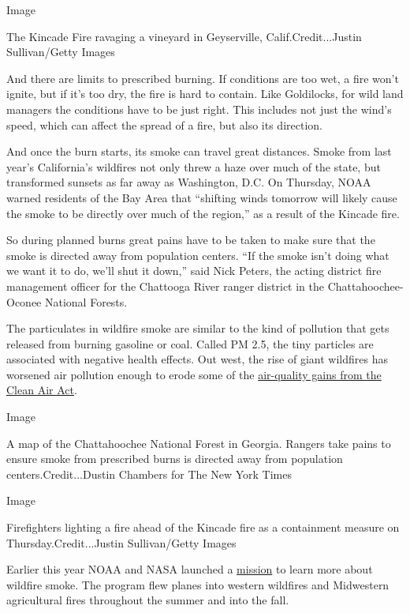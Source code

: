 Image

The Kincade Fire ravaging a vineyard in Geyserville,
Calif.Credit...Justin Sullivan/Getty Images

And there are limits to prescribed burning. If conditions are too wet, a
fire won't ignite, but if it's too dry, the fire is hard to contain.
Like Goldilocks, for wild land managers the conditions have to be just
right. This includes not just the wind's speed, which can affect the
spread of a fire, but also its direction.

And once the burn starts, its smoke can travel great distances. Smoke
from last year's California's wildfires not only threw a haze over much
of the state, but transformed sunsets as far away as Washington, D.C. On
Thursday, NOAA warned residents of the Bay Area that ``shifting winds
tomorrow will likely cause the smoke to be directly over much of the
region,'' as a result of the Kincade fire.

So during planned burns great pains have to be taken to make sure that
the smoke is directed away from population centers. ``If the smoke isn't
doing what we want it to do, we'll shut it down,'' said Nick Peters, the
acting district fire management officer for the Chattooga River ranger
district in the Chattahoochee-Oconee National Forests.

The particulates in wildfire smoke are similar to the kind of pollution
that gets released from burning gasoline or coal. Called PM 2.5, the
tiny particles are associated with negative health effects. Out west,
the rise of giant wildfires has worsened air pollution enough to erode
some of the \href{https://www.pnas.org/content/115/31/7901}{air-quality
gains from the Clean Air Act}.

Image

A map of the Chattahoochee National Forest in Georgia. Rangers take
pains to ensure smoke from prescribed burns is directed away from
population centers.Credit...Dustin Chambers for The New York Times

Image

Firefighters lighting a fire ahead of the Kincade fire as a containment
measure on Thursday.Credit...Justin Sullivan/Getty Images

Earlier this year NOAA and NASA launched a
\href{https://esrl.noaa.gov/csd/projects/firex-aq/}{mission} to learn
more about wildfire smoke. The program flew planes into western
wildfires and Midwestern agricultural fires throughout the summer and
into the fall.

